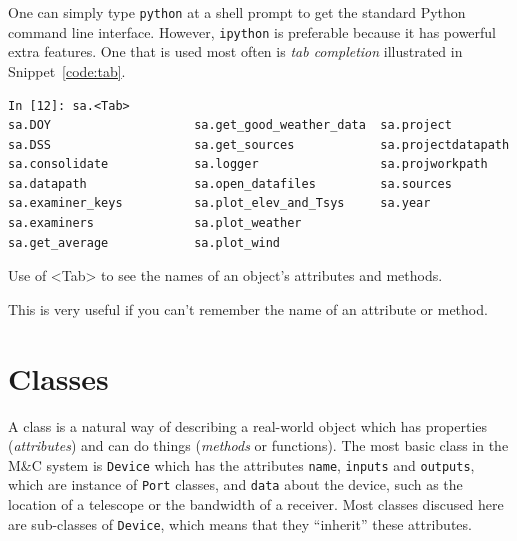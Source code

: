 \documentclass[letterpaper,11pt]{book}
\begin{document}
One can simply type {\tt python} at a shell prompt to get the standard Python
command line interface.  However, {\tt ipython} is preferable because it has
powerful extra features.  One that is used most often is {\it tab completion}
illustrated in Snippet~\ref{code:tab}.
\begin{code}[h!tb]
\begin{center}
\begin{verbatim}
In [12]: sa.<Tab>
sa.DOY                    sa.get_good_weather_data  sa.project
sa.DSS                    sa.get_sources            sa.projectdatapath
sa.consolidate            sa.logger                 sa.projworkpath
sa.datapath               sa.open_datafiles         sa.sources
sa.examiner_keys          sa.plot_elev_and_Tsys     sa.year
sa.examiners              sa.plot_weather           
sa.get_average            sa.plot_wind\end{verbatim}
\caption[{\ttfamily ipython} tab completion]{\label{code:tab}Use of
{\ttfamily <Tab>} to see the names of an object's attributes and methods.}
\end{center}
\end{code}
This is very useful if you can't remember the name of an attribute or method.


\section{Classes}

A class is a natural way 
of describing a real-world object which has properties ({\it attributes}) and can
do things ({\it methods} or functions). 
The most basic class in the M\&C system is {\tt Device} which has the attributes 
{\tt name}, {\tt inputs} and {\tt outputs}, which are instance of {\tt Port}
classes, and {\tt data} about the device, such as the location of a telescope
or the bandwidth of a receiver.  Most classes discused here are sub-classes of 
{\tt Device}, which means that they ``inherit'' these attributes.
\end{document}
